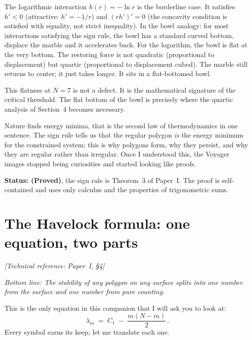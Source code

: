 The logarithmic interaction $h(r) = -\ln r$ is the borderline case.
It satisfies $h' < 0$ (attractive: $h' = -1/r$) and
$(rh')' = 0$ (the concavity condition is satisfied with
equality, not strict inequality). In the bowl analogy: for most
interactions satisfying the sign rule, the bowl has a standard curved
bottom, displace the marble and it accelerates back. For the
logarithm, the bowl is flat at the very bottom. The restoring force is
not quadratic (proportional to displacement) but quartic
(proportional to displacement cubed). The marble still returns to
center; it just takes longer. It sits in a flat-bottomed bowl.

This flatness at $N = 7$ is not a defect. It is the mathematical
signature of the critical threshold. The flat bottom of the bowl is
precisely where the quartic analysis of Section~4 becomes necessary.

Nature finds energy minima, that is the second law of thermodynamics
in one sentence. The sign rule tells us that the regular polygon
\emph{is} the energy minimum for the constrained system; this is why
polygons form, why they persist, and why they are regular rather than
irregular. Once I understood this, the Voyager images stopped being
curiosities and started looking like proofs.

\textbf{Status: (Proved)}, the sign rule is Theorem~3 of Paper~I.
The proof is self-contained and uses only calculus and the properties
of trigonometric sums.


\section{The Havelock formula: one equation, two parts}
\noindent\textit{[Technical reference: Paper~I, \S4]}

\medskip

\noindent\textit{Bottom line: The stability of any polygon on any
surface splits into one number from the surface and one number from
pure counting.}

\medskip

This is the only equation in this companion that I will ask you to
look at:
\begin{equation}\label{eq:havelock-companion}
  \lambda_m \;=\; C_1 \;-\; \frac{m(N-m)}{2}\,.
\end{equation}
Every symbol earns its keep; let me translate each one.

